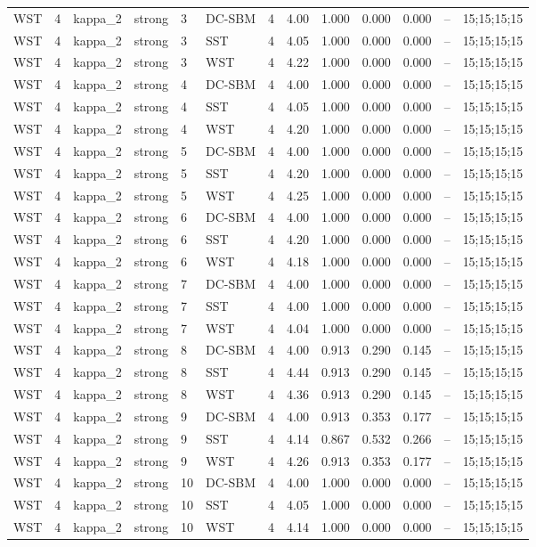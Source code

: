 \begin{table}[!h]
\begin{tabular}[t]{lllllllllllll}
WST & 4 & kappa_2 & strong & 3 & DC-SBM & 4 & 4.00 & 1.000 & 0.000 & 0.000 & -- & 15;15;15;15\\
WST & 4 & kappa_2 & strong & 3 & SST & 4 & 4.05 & 1.000 & 0.000 & 0.000 & -- & 15;15;15;15\\
WST & 4 & kappa_2 & strong & 3 & WST & 4 & 4.22 & 1.000 & 0.000 & 0.000 & -- & 15;15;15;15\\
WST & 4 & kappa_2 & strong & 4 & DC-SBM & 4 & 4.00 & 1.000 & 0.000 & 0.000 & -- & 15;15;15;15\\
WST & 4 & kappa_2 & strong & 4 & SST & 4 & 4.05 & 1.000 & 0.000 & 0.000 & -- & 15;15;15;15\\
WST & 4 & kappa_2 & strong & 4 & WST & 4 & 4.20 & 1.000 & 0.000 & 0.000 & -- & 15;15;15;15\\
WST & 4 & kappa_2 & strong & 5 & DC-SBM & 4 & 4.00 & 1.000 & 0.000 & 0.000 & -- & 15;15;15;15\\
WST & 4 & kappa_2 & strong & 5 & SST & 4 & 4.20 & 1.000 & 0.000 & 0.000 & -- & 15;15;15;15\\
WST & 4 & kappa_2 & strong & 5 & WST & 4 & 4.25 & 1.000 & 0.000 & 0.000 & -- & 15;15;15;15\\
WST & 4 & kappa_2 & strong & 6 & DC-SBM & 4 & 4.00 & 1.000 & 0.000 & 0.000 & -- & 15;15;15;15\\
WST & 4 & kappa_2 & strong & 6 & SST & 4 & 4.20 & 1.000 & 0.000 & 0.000 & -- & 15;15;15;15\\
WST & 4 & kappa_2 & strong & 6 & WST & 4 & 4.18 & 1.000 & 0.000 & 0.000 & -- & 15;15;15;15\\
WST & 4 & kappa_2 & strong & 7 & DC-SBM & 4 & 4.00 & 1.000 & 0.000 & 0.000 & -- & 15;15;15;15\\
WST & 4 & kappa_2 & strong & 7 & SST & 4 & 4.00 & 1.000 & 0.000 & 0.000 & -- & 15;15;15;15\\
WST & 4 & kappa_2 & strong & 7 & WST & 4 & 4.04 & 1.000 & 0.000 & 0.000 & -- & 15;15;15;15\\
WST & 4 & kappa_2 & strong & 8 & DC-SBM & 4 & 4.00 & 0.913 & 0.290 & 0.145 & -- & 15;15;15;15\\
WST & 4 & kappa_2 & strong & 8 & SST & 4 & 4.44 & 0.913 & 0.290 & 0.145 & -- & 15;15;15;15\\
WST & 4 & kappa_2 & strong & 8 & WST & 4 & 4.36 & 0.913 & 0.290 & 0.145 & -- & 15;15;15;15\\
WST & 4 & kappa_2 & strong & 9 & DC-SBM & 4 & 4.00 & 0.913 & 0.353 & 0.177 & -- & 15;15;15;15\\
WST & 4 & kappa_2 & strong & 9 & SST & 4 & 4.14 & 0.867 & 0.532 & 0.266 & -- & 15;15;15;15\\
WST & 4 & kappa_2 & strong & 9 & WST & 4 & 4.26 & 0.913 & 0.353 & 0.177 & -- & 15;15;15;15\\
WST & 4 & kappa_2 & strong & 10 & DC-SBM & 4 & 4.00 & 1.000 & 0.000 & 0.000 & -- & 15;15;15;15\\
WST & 4 & kappa_2 & strong & 10 & SST & 4 & 4.05 & 1.000 & 0.000 & 0.000 & -- & 15;15;15;15\\
WST & 4 & kappa_2 & strong & 10 & WST & 4 & 4.14 & 1.000 & 0.000 & 0.000 & -- & 15;15;15;15\\
\bottomrule
\end{tabular}
\end{table}
